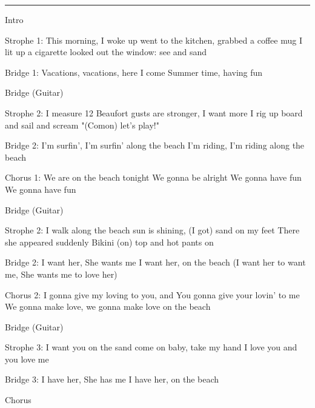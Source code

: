 \noindent\rule{\columnwidth}{1pt}

\begin{multicols}{2}
\begin{lstsong}
Intro

Strophe 1:
This morning, I woke up
went to the kitchen, grabbed a coffee mug
I lit up a cigarette
looked out the window: see and sand

Bridge 1:
Vacations, vacations, here I come
Summer time, having fun

Bridge (Guitar)

Strophe 2:
I measure 12 Beaufort
gusts are stronger, I want more
I rig up board and sail
and scream "(Comon) let's play!"

Bridge 2:
I'm surfin', I'm surfin' along the beach
I'm riding, I'm riding along the beach

Chorus 1:
We are on the beach tonight
We gonna be alright
We gonna have fun
We gonna have fun

Bridge (Guitar)

Strophe 2:
I walk along the beach
sun is shining, (I got) sand on my feet
There she appeared suddenly
Bikini (on) top and hot pants on

Bridge 2:
I want her, She wants me
I want her, on the beach
(I want her to want me,
She wants me to love her)

Chorus 2:
I gonna give my loving to you, and
You gonna give your lovin' to me
We gonna make love, we gonna make love
on the beach

Bridge (Guitar)

Strophe 3:
I want you on the sand
come on baby, take my hand
I love you and 
you love me

Bridge 3:
I have her, She has me
I have her, on the beach

Chorus
\end{lstsong}
\end{multicols}
\newpage

